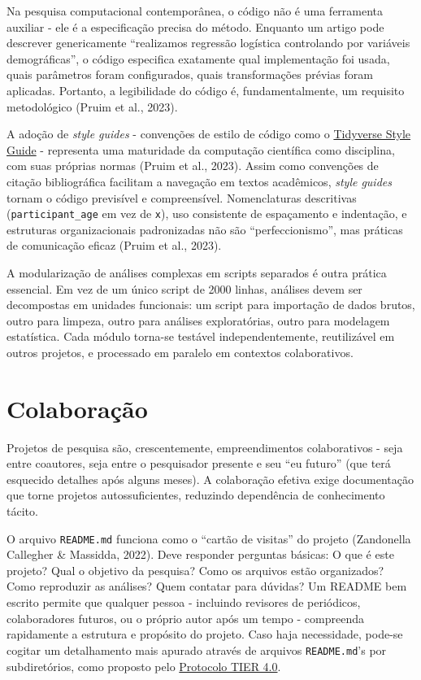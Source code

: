 \documentclass[
  a4paper,
]{book}
\begin{document}
Na pesquisa computacional contemporânea, o código não é uma ferramenta
auxiliar - ele é a especificação precisa do método. Enquanto um artigo
pode descrever genericamente ``realizamos regressão logística
controlando por variáveis demográficas'', o código especifica exatamente
qual implementação foi usada, quais parâmetros foram configurados, quais
transformações prévias foram aplicadas. Portanto, a legibilidade do
código é, fundamentalmente, um requisito metodológico (Pruim et al.,
2023).

A adoção de \emph{style guides} - convenções de estilo de código como o
\href{https://style.tidyverse.org/}{Tidyverse Style Guide} - representa
uma maturidade da computação científica como disciplina, com suas
próprias normas (Pruim et al., 2023). Assim como convenções de citação
bibliográfica facilitam a navegação em textos acadêmicos, \emph{style
guides} tornam o código previsível e compreensível. Nomenclaturas
descritivas (\texttt{participant\_age} em vez de \texttt{x}), uso
consistente de espaçamento e indentação, e estruturas organizacionais
padronizadas não são ``perfeccionismo'', mas práticas de comunicação
eficaz (Pruim et al., 2023).

A modularização de análises complexas em scripts separados é outra
prática essencial. Em vez de um único script de 2000 linhas, análises
devem ser decompostas em unidades funcionais: um script para importação
de dados brutos, outro para limpeza, outro para análises exploratórias,
outro para modelagem estatística. Cada módulo torna-se testável
independentemente, reutilizável em outros projetos, e processado em
paralelo em contextos colaborativos.

\section{Colaboração}\label{colaborauxe7uxe3o}

Projetos de pesquisa são, crescentemente, empreendimentos colaborativos
- seja entre coautores, seja entre o pesquisador presente e seu ``eu
futuro'' (que terá esquecido detalhes após alguns meses). A colaboração
efetiva exige documentação que torne projetos autossuficientes,
reduzindo dependência de conhecimento tácito.

O arquivo \texttt{README.md} funciona como o ``cartão de visitas'' do
projeto (Zandonella Callegher \& Massidda, 2022). Deve responder
perguntas básicas: O que é este projeto? Qual o objetivo da pesquisa?
Como os arquivos estão organizados? Como reproduzir as análises? Quem
contatar para dúvidas? Um README bem escrito permite que qualquer pessoa
- incluindo revisores de periódicos, colaboradores futuros, ou o próprio
autor após um tempo - compreenda rapidamente a estrutura e propósito do
projeto. Caso haja necessidade, pode-se cogitar um detalhamento mais
apurado através de arquivos \texttt{README.md}'s por subdiretórios, como
proposto pelo
\href{https://www.projecttier.org/tier-protocol/protocol-4-0/}{Protocolo
TIER 4.0}.
\end{document}

